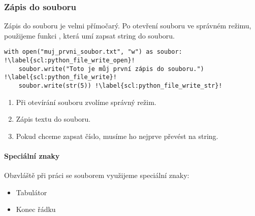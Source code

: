 \subsubsection{Zápis do souboru}
Zápis do souboru je velmi přímočarý. Po otevření souboru ve správném režimu, použijeme funkci , která umí zapsat string do souboru.

\begin{minipage}[t]{.45\textwidth}
\begin{code}
\begin{verbatim}
with open("muj_prvni_soubor.txt", "w") as soubor:  !\label{scl:python_file_write_open}!
	soubor.write("Toto je můj první zápis do souboru.") !\label{scl:python_file_write}!
	soubor.write(str(5)) !\label{scl:python_file_write_str}!
\end{verbatim}

\label{code:python_file_write}
\end{code}
\end{minipage}
\begin{minipage}[t]{.45\textwidth}
\begin{enumerate}
\vspace{1cm}
\item[ř. \ref{scl:python_file_write_open}:] Při otevírání souboru zvolíme správný režim.
\item[ř. \ref{scl:python_file_write}:] Zápis textu do souboru.
\item[ř. \ref{scl:python_file_write_str}:] Pokud chceme zapsat číslo, musíme ho nejprve převést na string.
\end{enumerate}
\end{minipage}

\paragraph{Speciální znaky}
Obzvláště při práci se souborem využijeme speciální znaky:
\begin{itemize}
\item[\textbf{"$ \backslash t $"}] Tabulátor
\item[\textbf{"$ \backslash n $"}] Konec řádku
\end{itemize}


